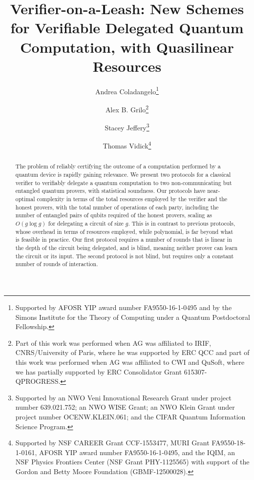 \documentclass{toc}
\begin{document}
\begin{frontmatter}

\title{Verifier-on-a-Leash: New Schemes for Verifiable Delegated Quantum Computation, with Quasilinear Resources}

\author[coladangelo]{Andrea Coladangelo\thanks{Supported by AFOSR YIP award number FA9550-16-1-0495 and by the Simons Institute for the Theory of Computing under a Quantum Postdoctoral Fellowship.}}
\author[grilo]{Alex B. Grilo\thanks{Part of this work was performed when AG was affiliated to IRIF, CNRS/University of Paris, where he was supported by ERC QCC and part of this work was performed when AG was affiliated to CWI and QuSoft, where we has partially supported by ERC Consolidator Grant 615307-QPROGRESS.}}
\author[jeffery]{Stacey Jeffery\thanks{Supported by an NWO Veni Innovational Research Grant under project number 639.021.752; an NWO WISE Grant; an NWO Klein Grant under project number OCENW.KLEIN.061;
and the CIFAR Quantum Information Science Program.
}}
\author[vidick]{Thomas Vidick\thanks{Supported by NSF CAREER Grant CCF-1553477, MURI Grant FA9550-18-1-0161, AFOSR YIP award number FA9550-16-1-0495, and the IQIM, an NSF Physics Frontiers Center (NSF Grant PHY-1125565) with support of the Gordon and Betty Moore Foundation (GBMF-12500028).}}

\begin{abstract}
The problem of reliably certifying the outcome of a computation performed by a quantum device is rapidly gaining relevance. We present two protocols for a classical verifier to verifiably delegate a quantum computation to two non-communicating but entangled quantum provers, with statistical soundness. Our protocols have near-optimal complexity in terms of the total resources employed by the verifier and the honest provers, with the total number of operations of each party, including the number of entangled pairs of qubits required of the honest provers, scaling as $O(g\log g)$ for delegating a circuit of size $g$. This is in contrast to previous protocols, whose overhead in terms of resources employed, while polynomial, is
far beyond what is feasible in practice. 
Our first protocol requires a number of rounds that is linear in the depth of the circuit being delegated, and is blind, meaning neither prover can learn the circuit or its input. The second protocol is not blind, but requires only a constant number of rounds of interaction. 


\end{abstract}
\end{frontmatter}
\end{document}
